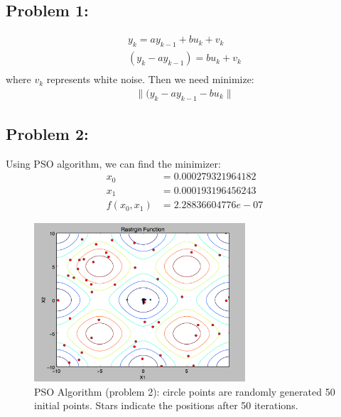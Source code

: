 \documentclass{article}
\begin{document}
 


\subsection*{{Problem 1: }}
\begin{align*} 
y_k=ay_{k-1} + bu_k + v_k\\
(y_k-ay_{k-1}) = bu_k + v_k \\
\end{align*}
where $v_k$ represents white noise. Then we need minimize: \\
\begin{align*} 
\|(y_k-ay_{k-1}-bu_k\| 
\end{align*}


\subsection*{{Problem 2: }}

Using PSO algorithm, we can find the minimizer: \\
\begin{align*}
x_0 & = 0.000279321964182 \\
x_1 & = 0.000193196456243 \\
f(x_0,x_1) & =  2.28836604776e-07
\end{align*}

\begin{figure}[h]
\includegraphics[width=0.7\textwidth]{PSO} 
\centering
\caption{PSO Algorithm (problem 2): circle points are randomly generated 50 initial points. Stars indicate the positions after 50 iterations. }

\end{figure}
\end{document}
